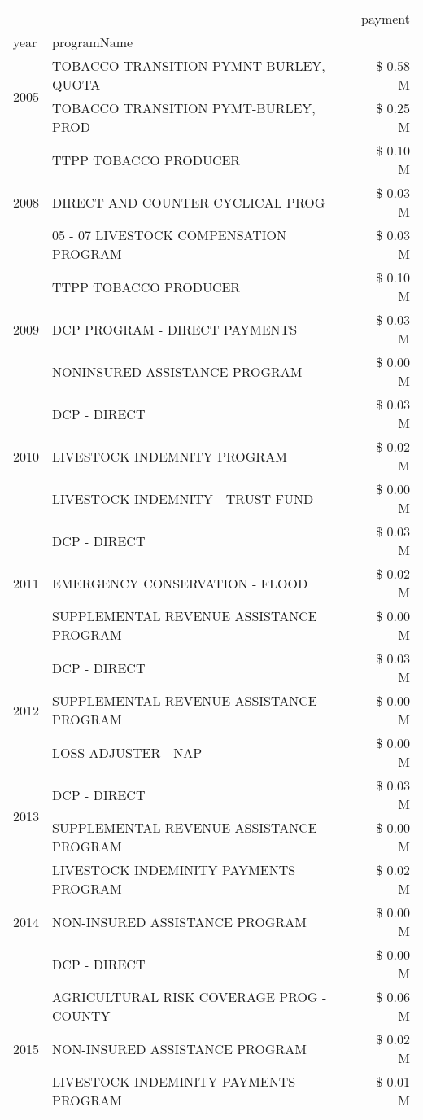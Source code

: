 \begin{tabular}{llr}
\toprule
 &  & payment \\
year & programName &  \\
\midrule
\multirow[t]{2}{*}{2005} & TOBACCO TRANSITION PYMNT-BURLEY, QUOTA & \$ 0.58 M \\
 & TOBACCO TRANSITION PYMT-BURLEY, PROD & \$ 0.25 M \\
\cline{1-3}
\multirow[t]{3}{*}{2008} & TTPP TOBACCO PRODUCER & \$ 0.10 M \\
 & DIRECT AND COUNTER CYCLICAL PROG & \$ 0.03 M \\
 & 05 - 07 LIVESTOCK COMPENSATION PROGRAM & \$ 0.03 M \\
\cline{1-3}
\multirow[t]{3}{*}{2009} & TTPP TOBACCO PRODUCER & \$ 0.10 M \\
 & DCP PROGRAM - DIRECT PAYMENTS & \$ 0.03 M \\
 & NONINSURED ASSISTANCE PROGRAM & \$ 0.00 M \\
\cline{1-3}
\multirow[t]{3}{*}{2010} & DCP - DIRECT & \$ 0.03 M \\
 & LIVESTOCK INDEMNITY PROGRAM & \$ 0.02 M \\
 & LIVESTOCK INDEMNITY - TRUST FUND & \$ 0.00 M \\
\cline{1-3}
\multirow[t]{3}{*}{2011} & DCP - DIRECT & \$ 0.03 M \\
 & EMERGENCY CONSERVATION - FLOOD & \$ 0.02 M \\
 & SUPPLEMENTAL REVENUE ASSISTANCE PROGRAM & \$ 0.00 M \\
\cline{1-3}
\multirow[t]{3}{*}{2012} & DCP - DIRECT & \$ 0.03 M \\
 & SUPPLEMENTAL REVENUE ASSISTANCE PROGRAM & \$ 0.00 M \\
 & LOSS ADJUSTER - NAP & \$ 0.00 M \\
\cline{1-3}
\multirow[t]{2}{*}{2013} & DCP - DIRECT & \$ 0.03 M \\
 & SUPPLEMENTAL REVENUE ASSISTANCE PROGRAM & \$ 0.00 M \\
\cline{1-3}
\multirow[t]{3}{*}{2014} & LIVESTOCK INDEMINITY PAYMENTS PROGRAM & \$ 0.02 M \\
 & NON-INSURED ASSISTANCE PROGRAM & \$ 0.00 M \\
 & DCP - DIRECT & \$ 0.00 M \\
\cline{1-3}
\multirow[t]{3}{*}{2015} & AGRICULTURAL RISK COVERAGE PROG - COUNTY & \$ 0.06 M \\
 & NON-INSURED ASSISTANCE PROGRAM & \$ 0.02 M \\
 & LIVESTOCK INDEMINITY PAYMENTS PROGRAM & \$ 0.01 M \\

\end{tabular}
